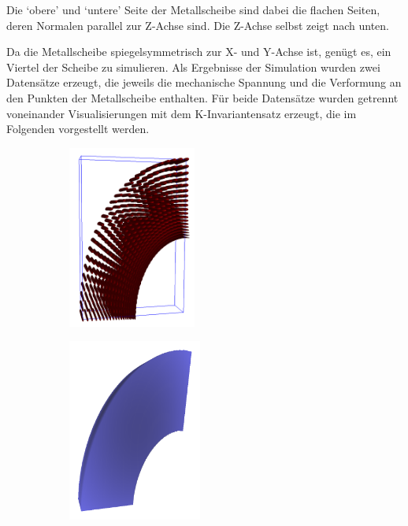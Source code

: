 \documentclass[a4paper,fontsize=12pt,toc=bib,halfparskip]{scrartcl}
\begin{document}
Die `obere' und `untere' Seite der Metallscheibe sind dabei die flachen Seiten, deren Normalen parallel zur Z-Achse sind. Die Z-Achse selbst zeigt nach unten.

Da die Metallscheibe spiegelsymmetrisch zur X- und Y-Achse ist, gen\"ugt es, ein Viertel der Scheibe zu simulieren. Als Ergebnisse der Simulation wurden zwei Datens\"atze erzeugt, die jeweils die mechanische Spannung und die Verformung an den Punkten der Metallscheibe enthalten. F\"ur beide Datens\"atze wurden getrennt voneinander Visualisierungen mit dem K-Invariantensatz erzeugt, die im Folgenden vorgestellt werden.


\begin{figure}
	\begin{subfigure}{0.3\textwidth}
		\centering
		\includegraphics[height=6cm]{pictures/results/MetalDiskStress_Ellipsoids.png}
		\subcaption{}
		\label{MetalDiskStressEllipsoids}
	\end{subfigure}
	\hspace*{\fill}
	\begin{subfigure}{0.3\textwidth}
		\centering
		\includegraphics[height=6cm]{pictures/results/MetalDiskStress_Object.png}
		\subcaption{}
		\label{MetalDiskStressObject}
	\end{subfigure}
	\hspace*{\fill}
	\begin{subfigure}{0.3\textwidth}

\end{subfigure}
\end{figure}
\end{document}
